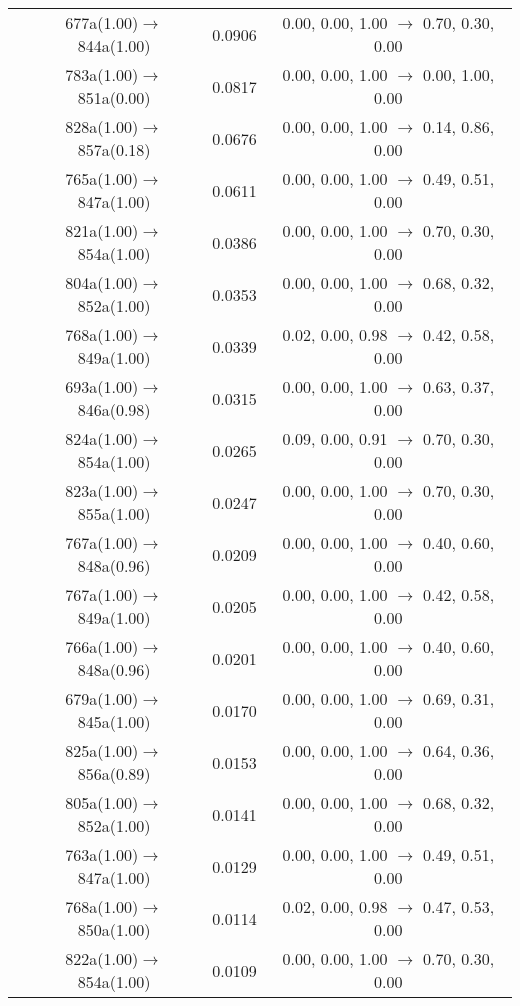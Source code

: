 \documentclass[10pt,a4paper]{article}
\begin{document}
\begin{longtable}{c|c|c|c}
 	& 677a(1.00)$\rightarrow$844a(1.00) &	 0.0906 &	 0.00, 0.00, 1.00 $\rightarrow$ 0.70, 0.30, 0.00 \\ 
 	& 783a(1.00)$\rightarrow$851a(0.00) &	 0.0817 &	 0.00, 0.00, 1.00 $\rightarrow$ 0.00, 1.00, 0.00 \\ 
 	& 828a(1.00)$\rightarrow$857a(0.18) &	 0.0676 &	 0.00, 0.00, 1.00 $\rightarrow$ 0.14, 0.86, 0.00 \\ 
 	& 765a(1.00)$\rightarrow$847a(1.00) &	 0.0611 &	 0.00, 0.00, 1.00 $\rightarrow$ 0.49, 0.51, 0.00 \\ 
 	& 821a(1.00)$\rightarrow$854a(1.00) &	 0.0386 &	 0.00, 0.00, 1.00 $\rightarrow$ 0.70, 0.30, 0.00 \\ 
 	& 804a(1.00)$\rightarrow$852a(1.00) &	 0.0353 &	 0.00, 0.00, 1.00 $\rightarrow$ 0.68, 0.32, 0.00 \\ 
 	& 768a(1.00)$\rightarrow$849a(1.00) &	 0.0339 &	 0.02, 0.00, 0.98 $\rightarrow$ 0.42, 0.58, 0.00 \\ 
 	& 693a(1.00)$\rightarrow$846a(0.98) &	 0.0315 &	 0.00, 0.00, 1.00 $\rightarrow$ 0.63, 0.37, 0.00 \\ 
 	& 824a(1.00)$\rightarrow$854a(1.00) &	 0.0265 &	 0.09, 0.00, 0.91 $\rightarrow$ 0.70, 0.30, 0.00 \\ 
 	& 823a(1.00)$\rightarrow$855a(1.00) &	 0.0247 &	 0.00, 0.00, 1.00 $\rightarrow$ 0.70, 0.30, 0.00 \\ 
 	& 767a(1.00)$\rightarrow$848a(0.96) &	 0.0209 &	 0.00, 0.00, 1.00 $\rightarrow$ 0.40, 0.60, 0.00 \\ 
 	& 767a(1.00)$\rightarrow$849a(1.00) &	 0.0205 &	 0.00, 0.00, 1.00 $\rightarrow$ 0.42, 0.58, 0.00 \\ 
 	& 766a(1.00)$\rightarrow$848a(0.96) &	 0.0201 &	 0.00, 0.00, 1.00 $\rightarrow$ 0.40, 0.60, 0.00 \\ 
 	& 679a(1.00)$\rightarrow$845a(1.00) &	 0.0170 &	 0.00, 0.00, 1.00 $\rightarrow$ 0.69, 0.31, 0.00 \\ 
 	& 825a(1.00)$\rightarrow$856a(0.89) &	 0.0153 &	 0.00, 0.00, 1.00 $\rightarrow$ 0.64, 0.36, 0.00 \\ 
 	& 805a(1.00)$\rightarrow$852a(1.00) &	 0.0141 &	 0.00, 0.00, 1.00 $\rightarrow$ 0.68, 0.32, 0.00 \\ 
 	& 763a(1.00)$\rightarrow$847a(1.00) &	 0.0129 &	 0.00, 0.00, 1.00 $\rightarrow$ 0.49, 0.51, 0.00 \\ 
 	& 768a(1.00)$\rightarrow$850a(1.00) &	 0.0114 &	 0.02, 0.00, 0.98 $\rightarrow$ 0.47, 0.53, 0.00 \\ 
 	& 822a(1.00)$\rightarrow$854a(1.00) &	 0.0109 &	 0.00, 0.00, 1.00 $\rightarrow$ 0.70, 0.30, 0.00 \\ 

\end{longtable}
\end{document}

